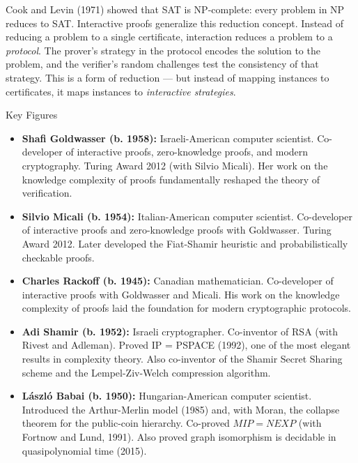 Cook and Levin (1971) showed that SAT is NP-complete: every problem in NP reduces to SAT. Interactive proofs generalize this reduction concept. Instead of reducing a problem to a single certificate, interaction reduces a problem to a \emph{protocol}. The prover's strategy in the protocol encodes the solution to the problem, and the verifier's random challenges test the consistency of that strategy. This is a form of reduction --- but instead of mapping instances to certificates, it maps instances to \emph{interactive strategies}.

\begin{subsection}{Key Figures}
\begin{itemize}
\item \textbf{Shafi Goldwasser (b. 1958):} Israeli-American computer scientist. Co-developer of interactive proofs, zero-knowledge proofs, and modern cryptography. Turing Award 2012 (with Silvio Micali). Her work on the knowledge complexity of proofs fundamentally reshaped the theory of verification.

\item \textbf{Silvio Micali (b. 1954):} Italian-American computer scientist. Co-developer of interactive proofs and zero-knowledge proofs with Goldwasser. Turing Award 2012. Later developed the Fiat-Shamir heuristic and probabilistically checkable proofs.

\item \textbf{Charles Rackoff (b. 1945):} Canadian mathematician. Co-developer of interactive proofs with Goldwasser and Micali. His work on the knowledge complexity of proofs laid the foundation for modern cryptographic protocols.

\item \textbf{Adi Shamir (b. 1952):} Israeli cryptographer. Co-inventor of RSA (with Rivest and Adleman). Proved IP = PSPACE (1992), one of the most elegant results in complexity theory. Also co-inventor of the Shamir Secret Sharing scheme and the Lempel-Ziv-Welch compression algorithm.

\item \textbf{László Babai (b. 1950):} Hungarian-American computer scientist. Introduced the Arthur-Merlin model (1985) and, with Moran, the collapse theorem for the public-coin hierarchy. Co-proved $MIP = NEXP$ (with Fortnow and Lund, 1991). Also proved graph isomorphism is decidable in quasipolynomial time (2015).
\end{itemize}
\end{subsection}


